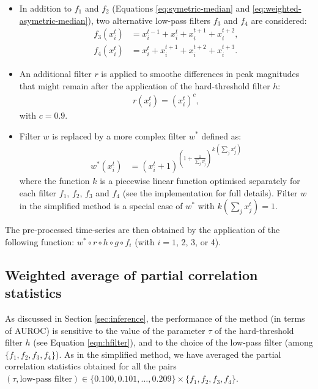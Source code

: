\documentclass[wcp]{jmlr}
\begin{document}
\begin{itemize}
\item In addition to $f_1$ and $f_2$ (Equations \ref{eq:symetric-median} and
  \ref{eq:weighted-asymetric-median}), two alternative low-pass filters $f_3$
  and $f_4$ are considered:
\begin{align}
f_3(x^t_i) &= x^{t-1}_i + x^{t}_i + x^{t+1}_i + x^{t+2}_i, \label{eq:asymetric-median-forward} \\
f_4(x^t_i) &=  x_i^t + x^{t+1}_i  + x^{t+2}_i + x^{t+3}_i. \label{eq:asymetric-median}
\end{align}
\item An additional filter $r$ is applied to smoothe differences in peak magnitudes
  that might remain after the application of the hard-threshold filter $h$:
\begin{align}
r(x^t_i) = (x_i^t)^c,
\end{align}
with $c=0.9$.
\item Filter $w$ is replaced by a more complex filter $w^*$ defined as:
\begin{align}
 w^*(x^{t}_i) &= {(x^{t}_i + 1 )^{\left (1 + \frac{1}{\sum_{j} x^{t}_j}\right )}}^{k(\sum_{j} x^{t}_j)}
\end{align}
where the function $k$ is a piecewise linear function optimised separately for
each filter $f_1$, $f_2$, $f_3$ and $f_4$ (see the implementation for full
details). Filter $w$ in the simplified method is a special case of $w^*$ with
$k(\sum_j x_j^t)=1$.
\end{itemize}
The pre-processed time-series are then obtained by the application of the
following function: $w^*\circ r \circ h \circ g \circ f_i$ (with $i=1$, 2, 3, or 4).

\subsection{Weighted average of partial correlation statistics}
\label{sapp:averaging}

As discussed in Section \ref{sec:inference}, the performance of the method (in
terms of AUROC) is sensitive to the value of the parameter $\tau$ of the
hard-threshold filter $h$ (see Equation \ref{eqn:hfilter}), and to the choice
of the low-pass filter (among $\{f_1, f_2, f_3, f_4\}$).
As in the simplified method, we have averaged the partial correlation statistics obtained for all the pairs $(\tau,\mbox{low-pass filter}) \in \{0.100,0.101,\ldots,0.209\}\times \{f_1, f_2, f_3, f_4\}$.
\end{document}
